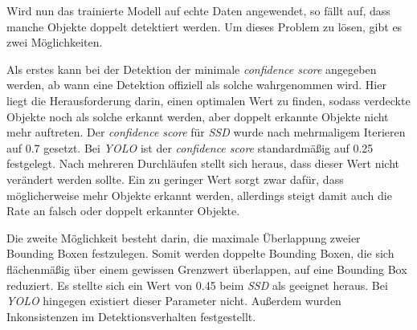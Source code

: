 Wird nun das trainierte Modell auf echte Daten angewendet, so fällt auf, dass manche Objekte doppelt detektiert werden. Um dieses Problem zu lösen, gibt es zwei Möglichkeiten. 

Als erstes kann bei der Detektion der minimale \textit{confidence score} angegeben werden, ab wann eine Detektion offiziell als solche wahrgenommen wird. Hier liegt die Herausforderung darin, einen optimalen Wert zu finden, sodass verdeckte Objekte noch als solche erkannt werden, aber doppelt erkannte Objekte nicht mehr auftreten. Der \textit{confidence score} für \textit{SSD} wurde nach mehrmaligem Iterieren auf 0.7 gesetzt. Bei \textit{YOLO} ist der \textit{confidence score} standardmäßig auf 0.25 festgelegt. Nach mehreren Durchläufen stellt sich heraus, dass dieser Wert nicht verändert werden sollte. Ein zu geringer Wert sorgt zwar dafür, dass möglicherweise mehr Objekte erkannt werden, allerdings steigt damit auch die Rate an falsch oder doppelt erkannter Objekte.

Die zweite Möglichkeit besteht darin, die maximale Überlappung zweier Bounding Boxen festzulegen. Somit werden doppelte Bounding Boxen, die sich flächenmäßig über einem gewissen Grenzwert überlappen, auf eine Bounding Box reduziert. Es stellte sich ein Wert von 0.45 beim \textit{SSD} als geeignet heraus. Bei \textit{YOLO} hingegen existiert dieser Parameter nicht. Außerdem wurden Inkonsistenzen im Detektionsverhalten festgestellt.

